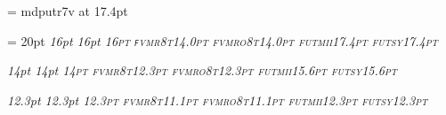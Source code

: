 \def\ttfontprefix{fvm}

\def\ttshape{r8t}
\def\ttbshape{b8t}
\def\ttslshape{ro8t}
\def\ttbslshape{bo8t}

\def\mtfontprefix{fut}

\def\mtitshape{mii}			%
\def\mtsyshape{sy}			%
\font\elevenex=  mdputr7v at 17.4pt 	%

\ifx\bigger\relax
  \def\textfontsize{17.4pt}
  \setfont\textrm\rmfontprefix\rmshape{\textfontsize}
\else
  \def\textfontsize{16pt}
  \textleading = 20pt 	%
  \setfont\textrm\rmfontprefix\rmshape{\textfontsize}
\fi
\setfont\textbf\rmfontprefix\bfshape{\textfontsize}
\setfont\textit\rmfontprefix\itshape{\textfontsize}
\setfont\textsl\rmfontprefix\slshape{\textfontsize}
\setfont\textsc\rmfontprefix\scshape{\textfontsize}
\setfont\texttt\ttfontprefix\ttshape{14.0pt}		%
\setfont\textttsl\ttfontprefix\ttslshape{14.0pt}	%
\setfont\texti\mtfontprefix\mtitshape{17.4pt}		%
\setfont\textsy\mtfontprefix\mtsyshape{17.4pt}		%

\setfont{}\rmfontprefix\bxshape{14.5pt} %
\def\df{\let\tentt=\deftt \let\tenbf = \defbf \bf}

\def\smallfontsize{14pt}		%
\setfont\smallrm\rmfontprefix\rmshape{\smallfontsize}
\setfont\smallbf\rmfontprefix\bfshape{\smallfontsize}
\setfont\smallit\rmfontprefix\itshape{\smallfontsize}
\setfont\smallsl\rmfontprefix\slshape{\smallfontsize}
\setfont\smallsc\rmfontprefix\scshape{\smallfontsize}
\setfont\smalltt\ttfontprefix\ttshape{12.3pt}		%
\setfont\smallttsl\ttfontprefix\ttslshape{12.3pt}
\setfont\smalli\mtfontprefix\mtitshape{15.6pt}
\setfont\smallsy\mtfontprefix\mtsyshape{15.6pt}

\def\smallerfontsize{12.3pt}		%
\setfont\smallerrm\rmfontprefix\rmshape{\smallerfontsize}
\setfont\smallerbf\rmfontprefix\bfshape{\smallerfontsize}
\setfont\smallerit\rmfontprefix\itshape{\smallerfontsize}
\setfont\smallersl\rmfontprefix\slshape{\smallerfontsize}
\setfont\smallersc\rmfontprefix\scshape{\smallerfontsize}
\setfont\smallertt\ttfontprefix\ttshape{11.1pt}
\setfont\smallerttsl\ttfontprefix\ttslshape{11.1pt}
\setfont\smalleri\mtfontprefix\mtitshape{\smallerfontsize}
\setfont\smallersy\mtfontprefix\mtsyshape{\smallerfontsize}

